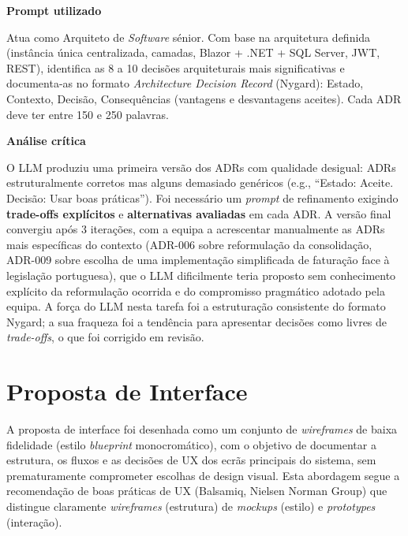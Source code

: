     \begin{tcolorbox}[title=Interação com o LLM]
    \textbf{Prompt utilizado}

    Atua como Arquiteto de \textit{Software} sénior. Com base na arquitetura definida (instância única centralizada, camadas, Blazor + .NET + SQL Server, JWT, REST), identifica as 8 a 10 decisões arquiteturais mais significativas e documenta-as no formato \textit{Architecture Decision Record} (Nygard): Estado, Contexto, Decisão, Consequências (vantagens e desvantagens aceites). Cada ADR deve ter entre 150 e 250 palavras.

    \tcblower

    \textbf{Análise crítica}

    O LLM produziu uma primeira versão dos ADRs com qualidade desigual: ADRs estruturalmente corretos mas alguns demasiado genéricos (e.g., ``Estado: Aceite. Decisão: Usar boas práticas''). Foi necessário um \textit{prompt} de refinamento exigindo \textbf{trade-offs explícitos} e \textbf{alternativas avaliadas} em cada ADR. A versão final convergiu após 3 iterações, com a equipa a acrescentar manualmente as ADRs mais específicas do contexto (ADR-006 sobre reformulação da consolidação, ADR-009 sobre escolha de uma implementação simplificada de faturação face à legislação portuguesa), que o LLM dificilmente teria proposto sem conhecimento explícito da reformulação ocorrida e do compromisso pragmático adotado pela equipa. A força do LLM nesta tarefa foi a estruturação consistente do formato Nygard; a sua fraqueza foi a tendência para apresentar decisões como livres de \textit{trade-offs}, o que foi corrigido em revisão.
    \end{tcolorbox}

\section{Proposta de Interface}
\label{sec:ui}

    A proposta de interface foi desenhada como um conjunto de \textit{wireframes} de baixa fidelidade (estilo \textit{blueprint} monocromático), com o objetivo de documentar a estrutura, os fluxos e as decisões de UX dos ecrãs principais do sistema, sem prematuramente comprometer escolhas de design visual. Esta abordagem segue a recomendação de boas práticas de UX (Balsamiq, Nielsen Norman Group) que distingue claramente \textit{wireframes} (estrutura) de \textit{mockups} (estilo) e \textit{prototypes} (interação).

